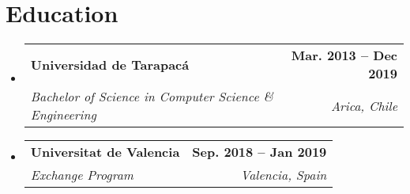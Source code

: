 \documentclass[letterpaper,11pt]{article}
\makeatletter
\newcommand{\resumeItem}[1]{
  \item\small{
    {#1 \vspace{-2pt}}
  }
}
\newcommand{\resumeSubheading}[4]{
  \vspace{-2pt}\item
    \begin{tabular*}{1.0\textwidth}[t]{l@{\extracolsep{\fill}}r}
      \textbf{#1} & \textbf{\small #2} \\
      \textit{\small#3} & \textit{\small #4} \\
    \end{tabular*}\vspace{-7pt}
}
\newcommand{\resumeProjectHeading}[2]{
    \item
    \begin{tabular*}{1.001\textwidth}{l@{\extracolsep{\fill}}r}
      \small#1 & \textbf{\small #2}\\
    \end{tabular*}\vspace{-7pt}
}
\newcommand{\resumeSubHeadingListStart}{\begin{itemize}[leftmargin=0.0in, label={}]}
\newcommand{\resumeSubHeadingListEnd}{\end{itemize}}
\newcommand{\resumeItemListStart}{\begin{itemize}}
\newcommand{\resumeItemListEnd}{\end{itemize}\vspace{-5pt}}
\makeatother
\begin{document}
\section{Education}
  \resumeSubHeadingListStart
    \resumeSubheading
      {Universidad de Tarapacá}{Mar. 2013 -- Dec 2019}
      {Bachelor of Science in Computer Science \& Engineering}{Arica, Chile}
    \resumeSubheading
      {Universitat de Valencia}{Sep. 2018 -- Jan 2019}
      {Exchange Program}{Valencia, Spain}
  \resumeSubHeadingListEnd




\end{document}
